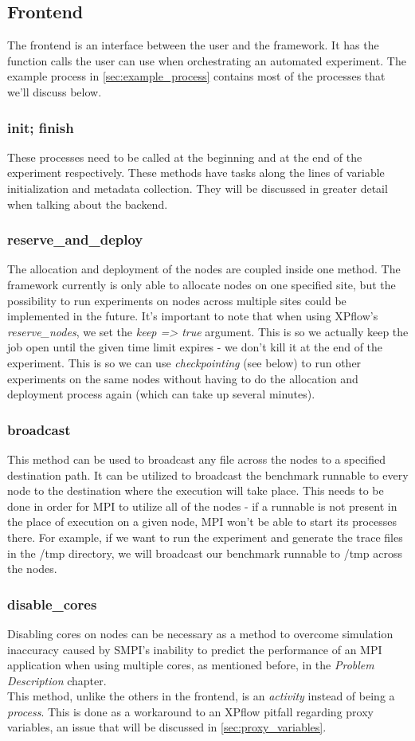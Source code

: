 \subsection{Frontend}
The frontend is an interface between the user and the framework. It
has the function calls the user can use when orchestrating an
automated experiment. The example process in \ref{sec:example_process}
contains most of the processes that we'll discuss below.
\subsubsection{init; finish}
These processes need to be called at the
beginning and at the end of the experiment respectively. These methods
have tasks along the lines of variable initialization and metadata
collection. They will be discussed in greater detail when talking
about the backend.
\label{sec:keeping_of_nodes}
\subsubsection{reserve\_and\_deploy}
The allocation and deployment of the nodes are coupled inside one
method. The framework currently is only able to allocate nodes on one
specified site, but the possibility to run experiments on nodes across
multiple
sites could be implemented in the future. It's important to note that
when using XPflow's \emph{reserve\_nodes}, we set the \emph{keep
  => true} argument. This is so we actually keep the job
open until the given time limit expires - we don't kill it at the end
of the experiment. This is so we can use \emph{checkpointing} (see
below) to run other experiments on the same nodes without having to do
the allocation and deployment process again (which can take up several
minutes).
\subsubsection{broadcast}
This method can be used to broadcast any file
across the nodes to a specified destination path. It can be utilized
to broadcast the benchmark runnable to every node to the destination
where the execution will take place. This needs to be done in order
for MPI to utilize all of the nodes - if a runnable is not present in
the place of execution on a given node, MPI won't be able to start its
processes there. For example, if we want to run the experiment and
generate the trace files in the /tmp directory, we will broadcast our
benchmark runnable to /tmp across the nodes.
\subsubsection{disable\_cores}
Disabling cores on nodes can be necessary
as a method to overcome simulation inaccuracy caused by SMPI's
inability to predict the performance of an MPI application when using
multiple cores, as mentioned before, in the \emph{Problem Description}
chapter.\\
This method, unlike the others in the frontend, is an \emph{activity}
instead of being a \emph{process}. This is done as a workaround to an
XPflow pitfall regarding proxy variables, an issue that will be
discussed in \ref{sec:proxy_variables}.
